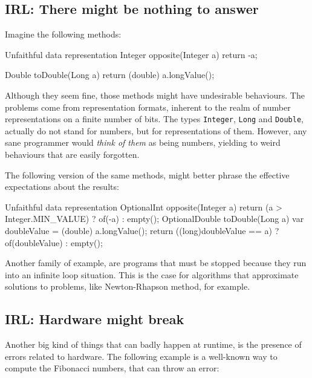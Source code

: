 \documentclass[12pt,a4paper]{report}
\renewcommand{\baselinestretch}{1.5}
\theoremstyle{theorem}
\theoremstyle{definition}
\begin{document}
\subsection{IRL: There might be nothing to answer}
Imagine the following methods:

\renewcommand{\baselinestretch}{1} 
\selectfont
\begin{javacode}{Unfaithful data representation}
Integer opposite(Integer a)
  { return -a; }
  
Double toDouble(Long a)
  { return (double) a.longValue(); }
\end{javacode}

\renewcommand{\baselinestretch}{1.5} 
\selectfont

Although they seem fine, those methods might have undesirable behaviours.
The problems come from representation formats, inherent to the
realm of number representations on a finite number of bits.
The types \lstinline{Integer}{}, \lstinline{Long}{}
and \lstinline{Double}{}, actually do not stand for numbers, but for
representations of them. However, any sane programmer would \emph{think of them}
as being numbers, yielding to weird behaviours that are easily forgotten.

The following version of the same methods, might better phrase
the effective expectations about the results:

\renewcommand{\baselinestretch}{1} 
\selectfont

\begin{javacode}{Unfaithful data representation}
OptionalInt opposite(Integer a)
{
  return (a > Integer.MIN_VALUE)
           ? of(-a)
           : empty();
}
OptionalDouble toDouble(Long a)
{
  var doubleValue = (double) a.longValue();
  return ((long)doubleValue == a)
           ? of(doubleValue)
           : empty();
}
\end{javacode}

\renewcommand{\baselinestretch}{1.5} 
\selectfont

Another family of example, are programs that must be stopped
because they run into an infinite loop situation.
This is the case for algorithms that approximate solutions to
problems, like Newton-Rhapson method, for example.

\subsection{IRL: Hardware might break}
Another big kind of things that can badly happen at runtime,
is the presence of errors related to hardware.
The following example is a well-known way to compute the Fibonacci numbers,
that can throw an error:
\end{document}
